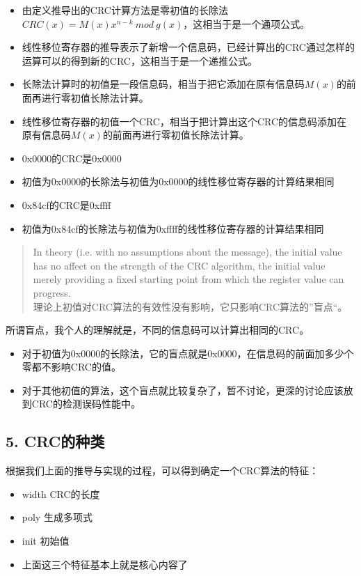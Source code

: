 \documentclass[
]{article}
\begin{document}
\begin{itemize}
\item
  由定义推导出的CRC计算方法是零初值的长除法$CRC(x)=M(x)x^{n-k} \: mod \: g(x)$，这相当于是一个通项公式。
\item
  线性移位寄存器的推导表示了新增一个信息码，已经计算出的CRC通过怎样的运算可以的得到新的CRC，这相当于是一个递推公式。
\item
  长除法计算时的初值是一段信息码，相当于把它添加在原有信息码$M(x)$的前面再进行零初值长除法计算。
\item
  线性移位寄存器的初值一个CRC，相当于把计算出这个CRC的信息码添加在原有信息码$M(x)$的前面再进行零初值长除法计算。
\item
  0x0000的CRC是0x0000
\item
  初值为0x0000的长除法与初值为0x0000的线性移位寄存器的计算结果相同
\item
  0x84cf的CRC是0xffff
\item
  初值为0x84cf的长除法与初值为0xffff的线性移位寄存器的计算结果相同
\end{itemize}

\begin{quote}
In theory (i.e. with no assumptions about the message), the initial
value has no affect on the strength of the CRC algorithm, the initial
value merely providing a fixed starting point from which the register
value can progress. \\
理论上初值对CRC算法的有效性没有影响，它只影响CRC算法的''盲点``。
\end{quote}

所谓盲点，我个人的理解就是，不同的信息码可以计算出相同的CRC。

\begin{itemize}
\item
  对于初值为0x0000的长除法，它的盲点就是0x0000，在信息码的前面加多少个零都不影响CRC的值。
\item
  对于其他初值的算法，这个盲点就比较复杂了，暂不讨论，更深的讨论应该放到CRC的检测误码性能中。
\end{itemize}

\hypertarget{header-n273}{%
\subsection{5. CRC的种类}\label{header-n273}}

根据我们上面的推导与实现的过程，可以得到确定一个CRC算法的特征：

\begin{itemize}
\item
  width CRC的长度
\item
  poly 生成多项式
\item
  init 初始值
\item
  上面这三个特征基本上就是核心内容了
\end{itemize}
\end{document}
